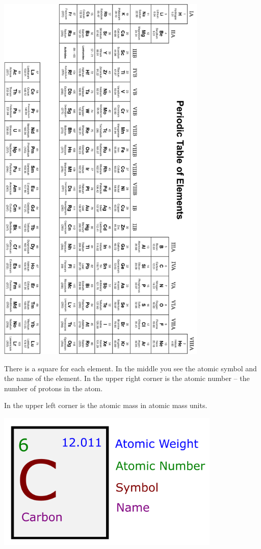 \includegraphics[width=0.75\textwidth]{periodic.png}


\pagebreak
There is a square for each element. In the middle you see the atomic
symbol and the name of the element. In the upper right corner is the
atomic number -- the number of protons in the atom.

In the upper left corner is the atomic mass in atomic mass units.

\includegraphics[width=0.8\textwidth]{Atomic_Carbon_Diagram.png}

